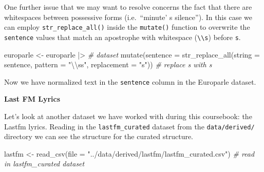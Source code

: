 \documentclass[
  letterpaper,
]{latex/krantz}
\newenvironment{Shaded}{\begin{snugshade}}{\end{snugshade}}
\newcommand{\AttributeTok}[1]{\textcolor[rgb]{0.00,0.00,0.00}{#1}}
\newcommand{\CommentTok}[1]{\textcolor[rgb]{0.00,0.00,0.00}{\textit{#1}}}
\newcommand{\FunctionTok}[1]{\textcolor[rgb]{0.00,0.00,0.00}{#1}}
\newcommand{\NormalTok}[1]{\textcolor[rgb]{0.00,0.00,0.00}{#1}}
\newcommand{\OtherTok}[1]{\textcolor[rgb]{0.00,0.00,0.00}{#1}}
\newcommand{\SpecialCharTok}[1]{\textcolor[rgb]{0.00,0.00,0.00}{#1}}
\newcommand{\StringTok}[1]{\textcolor[rgb]{0.00,0.00,0.00}{#1}}
\begin{document}
One further issue that we may want to resolve concerns the fact that
there are whitespaces between possessive forms (i.e.~``minute' s
silence''). In this case we can employ \texttt{str\_replace\_all()}
inside the \texttt{mutate()} function to overwrite the \texttt{sentence}
values that match an apostrophe \texttt{\textquotesingle{}} with
whitespace (\texttt{\textbackslash{}\textbackslash{}s}) before
\texttt{s}.

\begin{Shaded}
\begin{Highlighting}[]
\NormalTok{europarle }\OtherTok{\textless{}{-}} 
\NormalTok{  europarle }\SpecialCharTok{|\textgreater{}} \CommentTok{\# dataset}
  \FunctionTok{mutate}\NormalTok{(}\AttributeTok{sentence =} \FunctionTok{str\_replace\_all}\NormalTok{(}\AttributeTok{string =}\NormalTok{ sentence, }
                                    \AttributeTok{pattern =} \StringTok{"\textquotesingle{}}\SpecialCharTok{\textbackslash{}\textbackslash{}}\StringTok{ss"}\NormalTok{, }
                                    \AttributeTok{replacement =} \StringTok{"\textquotesingle{}s"}\NormalTok{)) }\CommentTok{\# replace \textquotesingle{} s with \textasciigrave{}s}
\end{Highlighting}
\end{Shaded}

Now we have normalized text in the \texttt{sentence} column in the
Europarle dataset.

\textbf{Last FM Lyrics}

Let's look at another dataset we have worked with during this
coursebook: the Lastfm lyrics. Reading in the \texttt{lastfm\_curated}
dataset from the \texttt{data/derived/} directory we can see the
structure for the curated structure.

\begin{Shaded}
\begin{Highlighting}[]
\NormalTok{lastfm }\OtherTok{\textless{}{-}} \FunctionTok{read\_csv}\NormalTok{(}\AttributeTok{file =} \StringTok{"../data/derived/lastfm/lastfm\_curated.csv"}\NormalTok{) }\CommentTok{\# read in lastfm\_curated dataset}
\end{Highlighting}
\end{Shaded}
\end{document}
